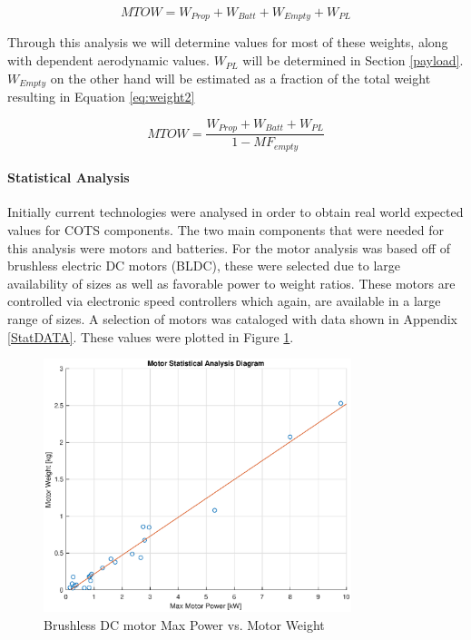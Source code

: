 \begin{equation}
    MTOW = W_{Prop} + W_{Batt} + W_{Empty} + W_{PL}
    \label{eq:weight}
\end{equation}

Through this analysis we will determine values for most of these weights, along with dependent aerodynamic values. $W_{PL}$ will be determined in Section \ref{payload}. $W_{Empty}$ on the other hand will be estimated as a fraction of the total weight resulting in Equation \ref{eq:weight2}

\begin{equation}
    MTOW = \dfrac{W_{Prop} + W_{Batt} + W_{PL}}{1 - MF_{empty}} 
    \label{eq:weight2}
\end{equation}

\paragraph{Statistical Analysis}
Initially current technologies were analysed in order to obtain real world expected values for COTS components. The two main components that were needed for this analysis were motors and batteries. For the motor analysis was based off of brushless electric DC motors (BLDC), these were selected due to large availability of sizes as well as favorable power to weight ratios. These motors are controlled via electronic speed controllers which again, are available in a large range of sizes. A selection of motors was cataloged with data shown in Appendix \ref{StatDATA}. These values were plotted in Figure \ref{fig:statmot}.

\begin{figure}[H]
    \centering
    \includegraphics[width = 0.8\textwidth]{PrelimSizing/motors.eps}
    \caption{Brushless DC motor Max Power vs. Motor Weight}
    \label{fig:statmot}
\end{figure}

